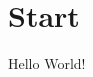 \documentclass[english]{mluexercise}
\begin{document}
    \maketitle

    \section{Start}

    Hello World!
\end{document}
